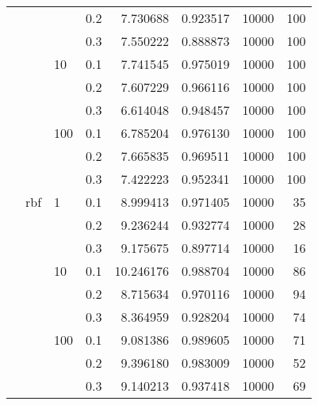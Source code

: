 \begin{table}[H]
\begin{tabular}{llllrrrr}
           &     &     & 0.2 &   7.730688 &  0.923517 &   10000 &   100 \\
           &     &     & 0.3 &   7.550222 &  0.888873 &   10000 &   100 \\
           &     & 10  & 0.1 &   7.741545 &  0.975019 &   10000 &   100 \\
           &     &     & 0.2 &   7.607229 &  0.966116 &   10000 &   100 \\
           &     &     & 0.3 &   6.614048 &  0.948457 &   10000 &   100 \\
           &     & 100 & 0.1 &   6.785204 &  0.976130 &   10000 &   100 \\
           &     &     & 0.2 &   7.665835 &  0.969511 &   10000 &   100 \\
           &     &     & 0.3 &   7.422223 &  0.952341 &   10000 &   100 \\
           & rbf & 1   & 0.1 &   8.999413 &  0.971405 &   10000 &    35 \\
           &     &     & 0.2 &   9.236244 &  0.932774 &   10000 &    28 \\
           &     &     & 0.3 &   9.175675 &  0.897714 &   10000 &    16 \\
           &     & 10  & 0.1 &  10.246176 &  0.988704 &   10000 &    86 \\
           &     &     & 0.2 &   8.715634 &  0.970116 &   10000 &    94 \\
           &     &     & 0.3 &   8.364959 &  0.928204 &   10000 &    74 \\
           &     & 100 & 0.1 &   9.081386 &  0.989605 &   10000 &    71 \\
           &     &     & 0.2 &   9.396180 &  0.983009 &   10000 &    52 \\
           &     &     & 0.3 &   9.140213 &  0.937418 &   10000 &    69 \\
\bottomrule
\end{tabular}
\end{table}
